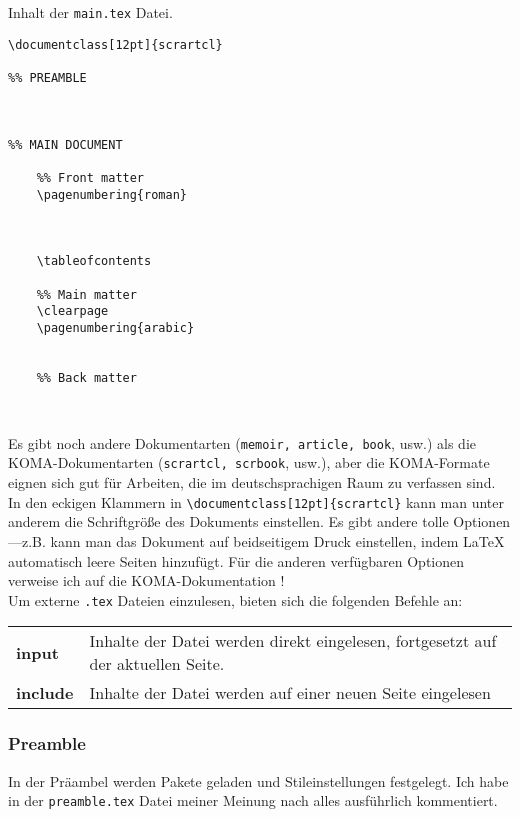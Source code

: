 Inhalt der \texttt{main.tex} Datei.

\begin{verbatim}
\documentclass[12pt]{scrartcl}
    
%% PREAMBLE
    
    

%% MAIN DOCUMENT

    %% Front matter
    \pagenumbering{roman}
    
        
    	
    \tableofcontents
	
    %% Main matter
    \clearpage
    \pagenumbering{arabic}
    
    
    %% Back matter
    
    

\end{verbatim}

Es gibt noch andere Dokumentarten
(\texttt{memoir, article, book}, usw.)
als die KOMA-Dokumentarten
(\texttt{scrartcl, scrbook}, usw.), aber die KOMA-Formate
eignen sich gut für Arbeiten,
die im deutschsprachigen Raum zu verfassen sind.\\

In  den eckigen Klammern in
\verb|\documentclass[12pt]{scrartcl}|
kann man
unter anderem die Schriftgröße des Dokuments einstellen.
Es gibt andere tolle Optionen—z.B. kann man das Dokument
auf beidseitigem Druck einstellen, indem \LaTeX{} automatisch
leere Seiten hinzufügt.
Für die anderen verfügbaren Optionen verweise ich auf
die KOMA-Dokumentation \cite{online:koma}!\\

Um externe \texttt{.tex} Dateien einzulesen, bieten sich die folgenden
Befehle an:
\begin{table}[H]
	\centering
	\begin{tabu} to 
	input	& Inhalte der Datei werden direkt eingelesen,
				fortgesetzt auf der aktuellen Seite.\\
	include	& Inhalte der Datei werden auf einer neuen Seite eingelesen
	\end{tabu}
\end{table}

\subsubsection{Preamble}
In der Präambel werden Pakete geladen und Stileinstellungen
festgelegt.
Ich habe in der \texttt{preamble.tex} Datei meiner Meinung nach
alles ausführlich kommentiert.\\


